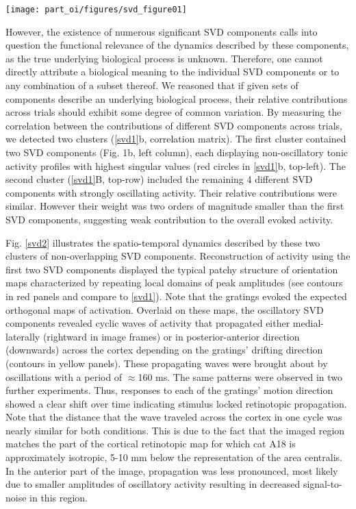 \begin{SCfigure}[][t]
\texttt{[image: part\_oi/figures/svd\_figure01]}
\caption[Decomposition of Evoked Cortical Voltage-Sensitive Dye Responses
to Moving Gratings.] { \protect}
\label{svd1} \end{SCfigure} 


However, the existence of numerous significant SVD components calls into
question the functional relevance of the dynamics described by these
components, as the true underlying biological process is unknown.
Therefore, one cannot directly attribute a biological meaning to the
individual SVD components or to any combination of a subset thereof. We
reasoned that if given sets of components describe an underlying biological
process, their relative contributions across trials should exhibit some
degree of common variation. By measuring the correlation between the
contributions of different SVD components across trials, we detected two
clusters (\ref{svd1}b, correlation matrix). The first cluster contained two
SVD components (Fig.  1b, left column), each displaying non-oscillatory
tonic activity profiles with highest singular values (red circles in
\ref{svd1}b, top-left). The second cluster (\ref{svd1}B, top-row) included
the remaining 4 different SVD components with strongly oscillating
activity. Their relative contributions were similar. However their weight
was two orders of magnitude smaller than the first SVD components,
suggesting weak contribution to the overall evoked activity.  

Fig. \ref{svd2} illustrates the spatio-temporal dynamics described by these
two clusters of non-overlapping SVD components.  Reconstruction of activity
using the first two SVD components displayed the typical patchy structure
of orientation maps characterized by repeating local domains of peak
amplitudes (see contours in red panels and compare to \ref{svd1}). Note
that the gratings evoked the expected orthogonal maps of activation.
Overlaid on these maps, the oscillatory SVD components revealed cyclic
waves of activity that propagated either medial-laterally (rightward in
image frames) or in posterior-anterior direction (downwards) across the
cortex depending on the gratings' drifting direction (contours in yellow
panels). These propagating waves were brought about by oscillations with a
period of $\approx$160 ms. The same patterns were observed in two further
experiments. Thus, responses to each of the gratings' motion direction
showed a clear shift over time indicating stimulus locked retinotopic
propagation. Note that the distance that the wave traveled across the
cortex in one cycle was nearly similar for both conditions. This is due to
the fact that the imaged region matches the part of the cortical
retinotopic map for which cat A18 is approximately isotropic, 5-10 mm below
the representation of the area centralis. In the anterior part of the
image, propagation was less pronounced, most likely due to smaller
amplitudes of oscillatory activity resulting in decreased signal-to-noise
in this region.  

